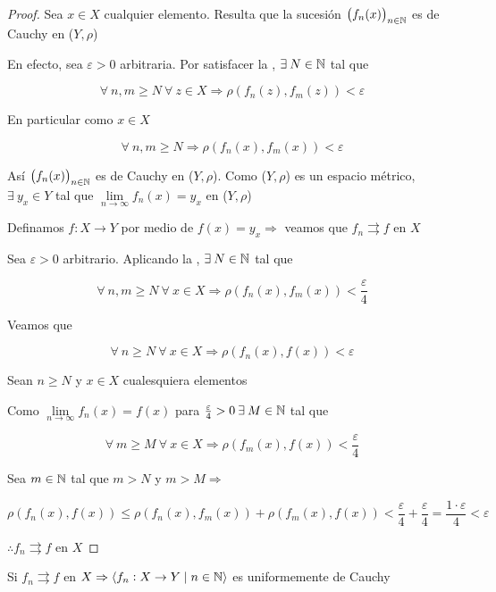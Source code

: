 \begin{proof}
    Sea $x \in X$ cualquier elemento. Resulta que la sucesión ${\left(f_n(x) \right)}_{n \in \mathbb{N}}$ es de Cauchy en ($Y,\rho$)

    En efecto, sea $\varepsilon > 0 $ arbitraria. Por satisfacer la , $\exists \: N \in \mathbb{N}$ tal que 

    $$\forall \: n, m \geqslant N \: \forall \: z \in X \Rightarrow \rho(f_n(z),f_m(z)) < \varepsilon$$

    En particular como $x \in X$

    $$\forall \: n, m \geqslant N  \Rightarrow \rho(f_n(x),f_m(x)) < \varepsilon$$

    Así ${\left(f_n(x) \right)}_{n \in \mathbb{N}}$ es de Cauchy en ($Y,\rho$). Como ($Y,\rho$) es un espacio métrico, $\exists \: y_x \in Y$ tal que $\lim\limits_{n \to \infty} f_n(x) = y_x$ en ($Y,\rho$)

    Definamos $f : X \to Y$ por medio de $f(x) = y_x \Rightarrow$ veamos que $f_n \rightrightarrows f$ en $X$

    Sea $\varepsilon > 0$ arbitrario. Aplicando la , $\exists \: N \in \mathbb{N}$ tal que 

    $$\forall \: n, m \geqslant N \: \forall \: x \in X \Rightarrow \rho(f_n(x),f_m(x)) < \frac{\varepsilon}{4}$$

    Veamos que 

    $$\forall \: n \geqslant  N \: \forall \: x \in X \Rightarrow \rho(f_n(x),f(x)) < \varepsilon$$

    Sean $n \geqslant N$ y $x \in X$ cualesquiera elementos

    Como $\lim\limits_{n \to \infty} f_n(x) = f(x)$ para $\frac{\varepsilon}{4} > 0 \: \exists \: M \in \mathbb{N}$ tal que

    $$\forall \: m \geqslant  M \: \forall \: x \in X \Rightarrow \rho(f_m(x),f(x)) < \frac{\varepsilon}{4}$$

    Sea $m \in \mathbb{N}$ tal que $m > N$ y $m > M \Rightarrow$

    $$\rho(f_n(x),f(x)) \leqslant \rho(f_n(x),f_m(x)) + \rho(f_m(x),f(x)) < \frac{\varepsilon}{4} + \frac{\varepsilon}{4} = \frac{1 \cdot \varepsilon}{4} < \varepsilon$$

    $\therefore f_n \rightrightarrows f$ en $X$
\end{proof}

\begin{lemma} \label{lemma533}
    Si  $f_n \rightrightarrows f$ en $X \Rightarrow \langle f_n : X \to Y \mid n \in \mathbb{N} \rangle$ es uniformemente de Cauchy 
\end{lemma}

